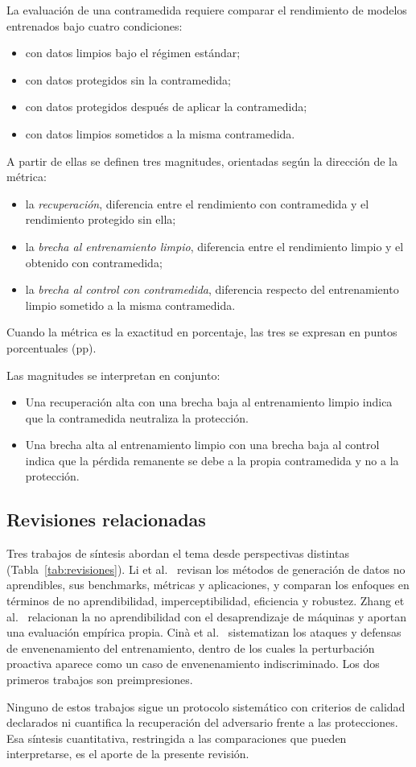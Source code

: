 La evaluación de una contramedida requiere comparar el rendimiento de modelos entrenados bajo cuatro condiciones:
\begin{itemize}
\item con datos limpios bajo el régimen estándar;
\item con datos protegidos sin la contramedida;
\item con datos protegidos después de aplicar la contramedida;
\item con datos limpios sometidos a la misma contramedida.
\end{itemize}
A partir de ellas se definen tres magnitudes, orientadas según la dirección de la métrica:
\begin{itemize}
\item la \emph{recuperación}, diferencia entre el rendimiento con contramedida y el rendimiento protegido sin ella;
\item la \emph{brecha al entrenamiento limpio}, diferencia entre el rendimiento limpio y el obtenido con contramedida;
\item la \emph{brecha al control con contramedida}, diferencia respecto del entrenamiento limpio sometido a la misma contramedida.
\end{itemize}
Cuando la métrica es la exactitud en porcentaje, las tres se expresan en puntos porcentuales (pp).

Las magnitudes se interpretan en conjunto:
\begin{itemize}
\item Una recuperación alta con una brecha baja al entrenamiento limpio indica que la contramedida neutraliza la protección.
\item Una brecha alta al entrenamiento limpio con una brecha baja al control indica que la pérdida remanente se debe a la propia contramedida y no a la protección.
\end{itemize}

\subsection{Revisiones relacionadas}

Tres trabajos de síntesis abordan el tema desde perspectivas distintas (Tabla~\ref{tab:revisiones}). Li et al.~\cite{li2025survey} revisan los métodos de generación de datos no aprendibles, sus benchmarks, métricas y aplicaciones, y comparan los enfoques en términos de no aprendibilidad, imperceptibilidad, eficiencia y robustez. Zhang et al.~\cite{zhang2026sok} relacionan la no aprendibilidad con el desaprendizaje de máquinas y aportan una evaluación empírica propia. Cinà et al.~\cite{cina2023wild} sistematizan los ataques y defensas de envenenamiento del entrenamiento, dentro de los cuales la perturbación proactiva aparece como un caso de envenenamiento indiscriminado. Los dos primeros trabajos son preimpresiones.

Ninguno de estos trabajos sigue un protocolo sistemático con criterios de calidad declarados ni cuantifica la recuperación del adversario frente a las protecciones. Esa síntesis cuantitativa, restringida a las comparaciones que pueden interpretarse, es el aporte de la presente revisión.


